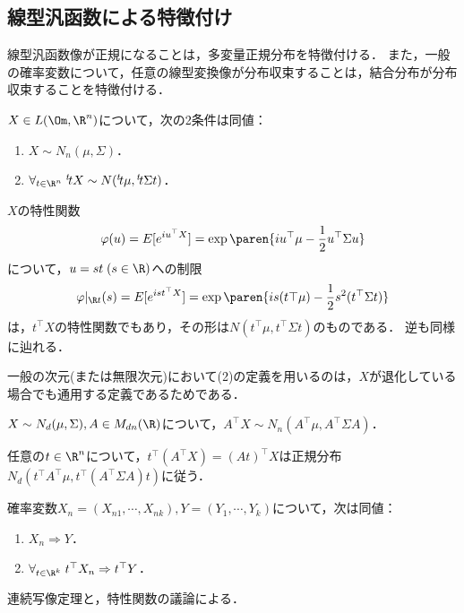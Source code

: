 \documentclass[uplatex,dvipdfmx]{jsreport}
\begin{document}
\subsection{線型汎函数による特徴付け}

\begin{tcolorbox}[colframe=ForestGreen, colback=ForestGreen!10!white,breakable,colbacktitle=ForestGreen!40!white,coltitle=black,fonttitle=\bfseries\sffamily,
title=]
    線型汎函数像が正規になることは，多変量正規分布を特徴付ける．
    また，一般の確率変数について，任意の線型変換像が分布収束することは，結合分布が分布収束することを特徴付ける．
\end{tcolorbox}

\begin{theorem}[Gauss測度の特徴付け]
    $X\in L(\Om,\R^n)$について，次の2条件は同値：
    \begin{enumerate}
        \item $X\sim N_n(\mu,\Sigma)$．
        \item $\forall_{t\in\R^n}\;{}^t\!tX\sim N({}^t\!t\mu,{}^t\!t\Sigma t)$．
    \end{enumerate}
\end{theorem}
\begin{Proof}
    $X$の特性関数
    \[\varphi(u)=E[e^{iu^\top X}]=\exp\paren{iu^\top\mu-\frac{1}{2}u^\top\Sigma u}\]
    について，$u=st\;(s\in\R)$への制限
    \[\varphi|_{\R t}(s)=E[e^{ist^\top X}]=\exp\paren{is(t\top\mu)-\frac{1}{2}s^2(t^\top\Sigma t)}\]
    は，$t^\top X$の特性関数でもあり，その形は$N(t^\top\mu,t^\top\Sigma t)$のものである．
    逆も同様に辿れる．
\end{Proof}
\begin{remarks}
    一般の次元(または無限次元)において(2)の定義を用いるのは，$X$が退化している場合でも通用する定義であるためである．
\end{remarks}

\begin{corollary}[多変量正規分布の線型変換の分布]
    $X\sim N_d(\mu,\Sigma),A\in M_{dn}(\R)$について，$A^\top X\sim N_n(A^\top\mu,A^\top\Sigma A)$．
\end{corollary}
\begin{Proof}
    任意の$t\in\R^n$について，$t^\top(A^\top X)=(At)^\top X$は正規分布$N_d(t^\top A^\top\mu,t^\top (A^\top\Sigma A)t)$に従う．
\end{Proof}

\begin{proposition}
    確率変数$X_n=(X_{n1},\cdots,X_{nk}),Y=(Y_1,\cdots,Y_k)$について，次は同値：
    \begin{enumerate}
        \item $X_n\Rightarrow Y$．
        \item $\forall_{t\in\R^k}\;t^\top X_{n}\Rightarrow t^\top Y$．
    \end{enumerate}
\end{proposition}
\begin{Proof}
    連続写像定理と，特性関数の議論による．
\end{Proof}
\end{document}
